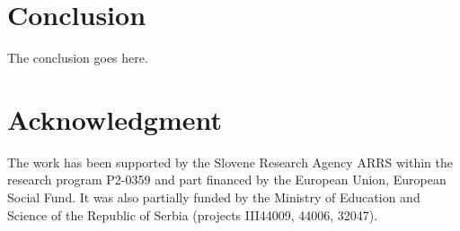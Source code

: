 \documentclass[conference]{IEEEtran}
\begin{document}
\section{Conclusion}
\label{sec:conclusion}
The conclusion goes here.






\section*{Acknowledgment}
The work has been supported by the Slovene Research Agency ARRS within the research program P2-0359 and part financed by the European Union, European Social Fund. It was also partially funded by the Ministry of Education and Science of the Republic of Serbia (projects III44009, 44006, 32047).









%






\end{document}
